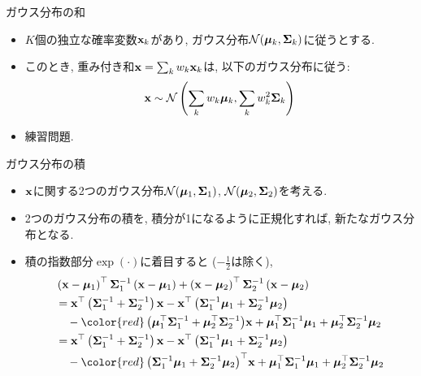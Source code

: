 \documentclass[dvipdfmx,notheorems,t]{beamer}
\begin{document}
\begin{frame}{ガウス分布の和}
\begin{itemize}
  \item $K$個の独立な確率変数$\vb{x}_k$があり, ガウス分布$\mathcal{N}(\vb*{\mu}_k, \vb{\Sigma}_k)$に従うとする.
  \item このとき, 重み付き和$\vb{x} = \sum_k w_k \vb{x}_k$は, 以下のガウス分布に従う:
  \begin{align*}
    \vb{x} \sim \mathcal{N} \left( \sum_k w_k \vb*{\mu}_k, \sum_k w_k^2 \vb{\Sigma}_k \right)
  \end{align*}
  \item 練習問題.
\end{itemize}
\end{frame}

\begin{frame}{ガウス分布の積}
\begin{itemize}
  \item $\vb{x}$に関する2つのガウス分布$\mathcal{N}(\vb*{\mu}_1, \vb{\Sigma}_1)$,
  $\mathcal{N}(\vb*{\mu}_2, \vb{\Sigma}_2)$を考える.
  \item 2つのガウス分布の積を, 積分が1になるように正規化すれば, 新たなガウス分布となる.
  \item 積の指数部分$\exp(\cdot)$に着目すると ($-\frac{1}{2}$は除く),
  \begin{align*}
    & \left( \vb{x} - \vb*{\mu}_1 \right)^\top
      \vb{\Sigma}_1^{-1} \left( \vb{x} - \vb*{\mu}_1 \right)
      + \left( \vb{x} - \vb*{\mu}_2 \right)^\top
      \vb{\Sigma}_2^{-1} \left( \vb{x} - \vb*{\mu}_2 \right) \\
    &= \vb{x}^\top \left( \vb{\Sigma}_1^{-1} + \vb{\Sigma}_2^{-1} \right) \vb{x}
      - \vb{x}^\top \left( \vb{\Sigma}_1^{-1} \vb*{\mu}_1 + \vb{\Sigma}_2^{-1} \vb*{\mu}_2 \right) \\
    & \quad - {\color{red} \left( \vb*{\mu}_1^\top \vb{\Sigma}_1^{-1} + \vb*{\mu}_2^\top \vb{\Sigma}_2^{-1} \right)} \vb{x}
      + \vb*{\mu}_1^\top \vb{\Sigma}_1^{-1} \vb*{\mu}_1
      + \vb*{\mu}_2^\top \vb{\Sigma}_2^{-1} \vb*{\mu}_2 \\
    &= \vb{x}^\top \left( \vb{\Sigma}_1^{-1} + \vb{\Sigma}_2^{-1} \right) \vb{x}
      - \vb{x}^\top \left( \vb{\Sigma}_1^{-1} \vb*{\mu}_1 + \vb{\Sigma}_2^{-1} \vb*{\mu}_2 \right) \\
    & \quad - {\color{red} \left( \vb{\Sigma}_1^{-1} \vb*{\mu}_1 + \vb{\Sigma}_2^{-1} \vb*{\mu}_2 \right)^\top} \vb{x}
      + \vb*{\mu}_1^\top \vb{\Sigma}_1^{-1} \vb*{\mu}_1
      + \vb*{\mu}_2^\top \vb{\Sigma}_2^{-1} \vb*{\mu}_2
  \end{align*}
\end{itemize}
\end{frame}
\end{document}
